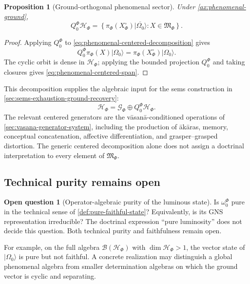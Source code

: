 \documentclass[11pt,reqno]{scrartcl}
\newcommand{\scrHF}{\mathscr H_{\Phi}}
\newcommand{\algF}{\mathfrak M_{\Phi}}
\newcommand{\piF}{\pi_{\Phi}}
\newcommand{\omegaF}{\omega_{0}^{\Phi}}
\newcommand{\QzeroF}{Q_{0}^{\Phi}}
\newcommand{\ket}[1]{\lvert #1\rangle}
\theoremstyle{plain}
\newtheorem{proposition}[proposition]{Proposition}
\theoremstyle{definition}
\newtheorem{openquestion}[openquestion]{Open question}
\theoremstyle{remark}
\begin{document}
\begin{proposition}[Ground-orthogonal phenomenal sector]
\label{prop:phenomenal-centered-cyclic}
Under \cref{ax:phenomenal-ground},
\begin{equation}
  \QzeroF\scrHF
  =\overline{
  \left\{
    \piF(X^{\circ}_{\Phi})\ket{\Omega_0}:
    X\in\algF
  \right\}}.
  \label{eq:phenomenal-centered-span}
\end{equation}
\end{proposition}

\begin{proof}
Applying $\QzeroF$ to \eqref{eq:phenomenal-centered-decomposition} gives
\begin{equation}
  \QzeroF\piF(X)\ket{\Omega_0}
  =\piF(X^{\circ}_{\Phi})\ket{\Omega_0}.
\end{equation}
The cyclic orbit is dense in $\scrHF$; applying the bounded projection
$\QzeroF$ and taking closures gives \eqref{eq:phenomenal-centered-span}.
\end{proof}

This decomposition supplies the algebraic input for the sems construction in
\cref{sec:sems-exhaustion-ground-recovery}:
\begin{equation}
  \scrHF
  =\mathscr G_{\Phi}\oplus\QzeroF\scrHF.
  \label{eq:phenomenal-ground-excitation-split}
\end{equation}
The relevant centered generators are the v\=asan\=a-conditioned operations of
\cref{sec:vasana-generator-system}, including the production of \=ak\=aras,
memory, conceptual concatenation, affective differentiation, and
grasper--grasped distortion.  The generic centered decomposition alone does
not assign a doctrinal interpretation to every element of $\algF$.

\subsection{Technical purity remains open}

\begin{openquestion}[Operator-algebraic purity of the luminous state]
\label{q:luminous-purity}
Is $\omegaF$ pure in the technical sense of
\cref{def:pure-faithful-state}?  Equivalently, is its GNS representation
irreducible?  The doctrinal expression ``pure luminosity'' does not decide
this question.  Both technical purity and faithfulness remain open.
\end{openquestion}

For example, on the full algebra $\mathcal B(\scrHF)$ with
$\dim\scrHF>1$, the vector state of $\ket{\Omega_0}$ is pure but not
faithful.  A concrete realization may distinguish a global phenomenal algebra
from smaller determination algebras on which the ground vector is cyclic and
separating.
\end{document}
